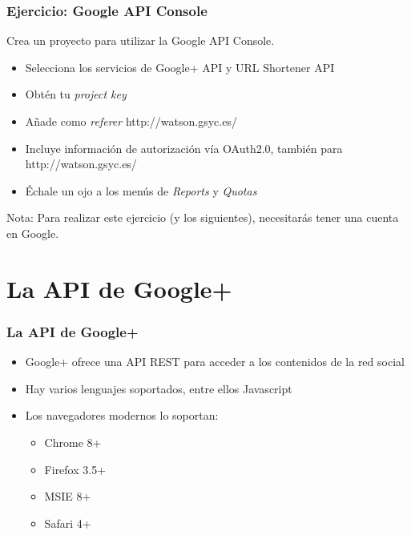 
\begin{frame}
\frametitle{Ejercicio: Google API Console}

Crea un proyecto para utilizar la Google API Console.

\begin{itemize}
  \item Selecciona los servicios de Google+ API y URL Shortener API
  \item Obtén tu \emph{project key}
  \item Añade como \emph{referer} http://watson.gsyc.es/
  \item Incluye información de autorización vía OAuth2.0, también para http://watson.gsyc.es/
  \item Échale un ojo a los menús de \emph{Reports} y \emph{Quotas}
\end{itemize}

Nota: Para realizar este ejercicio (y los siguientes), necesitarás tener
una cuenta en Google.

\end{frame}

\section{La API de Google+}


\begin{frame}[fragile]
\frametitle{La API de Google+}

\begin{itemize}
  \item Google+ ofrece una API REST para acceder a los contenidos de la red social
  \item Hay varios lenguajes soportados, entre ellos Javascript
  \item Los navegadores modernos lo soportan:
  \begin{itemize}
    \item Chrome 8+
    \item Firefox 3.5+
    \item MSIE 8+
    \item Safari 4+
  \end{itemize}
\end{itemize}


\end{frame}

